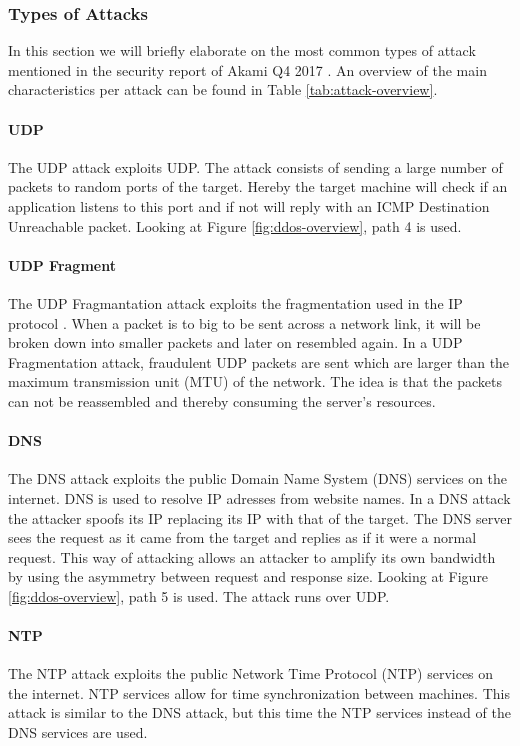\subsubsection{Types of Attacks}
In this section we will briefly elaborate on the most common types of attack mentioned in the security report of Akami Q4 2017 \cite{Akamai2017-4}. An overview of the main characteristics per attack can be found in Table \ref{tab:attack-overview}.


\paragraph{UDP}
The UDP attack exploits UDP. The attack consists of sending a large number of packets to random ports of the target. Hereby the target machine will check if an application listens to this port and if not will reply with an ICMP Destination Unreachable packet. Looking at Figure \ref{fig:ddos-overview}, path 4 is used.

\paragraph{UDP Fragment}
The UDP Fragmantation attack exploits the fragmentation used in the IP protocol \cite{imperva}. When a packet is to big to be sent across a network link, it will be broken down into smaller packets and later on resembled again. In a UDP Fragmentation attack, fraudulent UDP packets are sent which are larger than the maximum transmission unit (MTU) of the network. The idea is that the packets can not be reassembled and thereby consuming the server's resources. 

\paragraph{DNS}
The DNS attack exploits the public Domain Name System (DNS) services on the internet. DNS is used to resolve IP adresses from website names. In a DNS attack the attacker spoofs its IP replacing its IP with that of the target. The DNS server sees the request as it came from the target and replies as if it were a normal request. This way of attacking allows an attacker to amplify its own bandwidth by using the asymmetry between request and response size. Looking at Figure \ref{fig:ddos-overview}, path 5 is used. The attack runs over UDP.  

\paragraph{NTP}
The NTP attack exploits the public Network Time Protocol (NTP) services on the internet. NTP services allow for time synchronization between machines. This attack is similar to the DNS attack, but this time the NTP services instead of the DNS services are used. 

